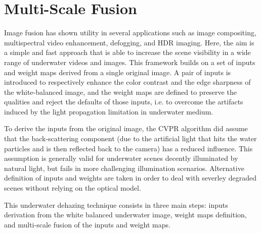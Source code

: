 \documentclass[hidelinks, 12pt]{report}
\begin{document}
\chapter{Multi-Scale Fusion}
\fancyhf{}
\fancyhead[r]{%
   \itshape
\footnotesize{\chaptermark}
   \leftmark}

\fancyfoot[RE,RO]{\footnotesize\thepage}

\justify
Image fusion has shown utility in several applications such as image compositing, multispectral video enhancement, defogging, and HDR imaging. Here, the aim is a simple and fast approach that is able to increase the scene visibility in a wide range of underwater videos and images. This framework builds on a set of inputs and weight maps derived from a single original image. A pair of inputs is introduced to respectively enhance the color contrast and the edge sharpness of the white-balanced image, and the weight maps are defined to preserve the qualities and reject the defaults of those inputs, i.e. to overcome the artifacts induced by the light propagation limitation in underwater medium. \par 
To derive the inputs from the original image, the CVPR algorithm did assume that the back-scattering component (due to the artificial light that hits the water particles and is then reflected back to the camera) has a reduced influence. This assumption is generally valid for underwater scenes decently illuminated by natural light, but fails in more challenging illumination scenarios. Alternative definition of inputs and weights are taken in order to deal with severley degraded scenes without relying on the optical model. \par
This underwater dehazing technique consists in three main steps: inputs derivation from the white balanced underwater image, weight maps definition, and multi-scale fusion of the inputs and weight maps.
\end{document}
